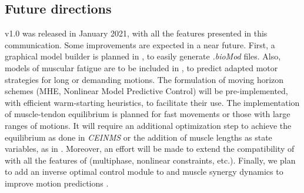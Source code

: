 \subsection{Future directions}

\bioptim v1.0 was released in January 2021, with all the features presented in this communication.
Some improvements are expected in a near future.
First, a graphical model builder is planned in \biorbd, to easily generate \textit{.bioMod} files.
Also, models of muscular fatigue are to be included in \bioptim, to predict adapted motor strategies for long or demanding motions.
The formulation of moving horizon schemes (MHE, Nonlinear Model Predictive Control) will be pre-implemented, with efficient warm-starting heuristics, to facilitate their use.
The implementation of muscle-tendon equilibrium is planned for fast movements or those with large ranges of motions. 
It will require an additional optimization step to achieve the equilibrium as done in \textit{CEINMS} \cite{pizzolato2015ceinms} or the addition of muscle lengths as state variables, as in \cite{van2011implicit}.  
Moreover, an effort will be made to extend the compatibility of \acados with all the features of \bioptim (multiphase, nonlinear constraints, etc.). 
Finally, we plan to add an inverse optimal control module to \bioptim and muscle synergy dynamics to improve motion predictions \cite{walter2014muscle}.